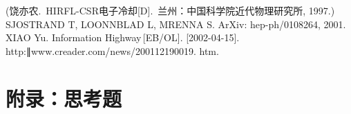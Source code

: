 \documentclass[a4paper,10.0pt,twoside]{npr}
\begin{document}
\begin{multicols}{2}
\begin{thebibliography}{90}
(饶亦农.\ HIRFL-CSR电子冷却[D].\ 兰州：中国科学院近代物理研究所, 1997.)
 SJOSTRAND T, LOONNBLAD L, MRENNA S. ArXiv: hep-ph/0108264, 2001.
 XIAO Yu. Information Highway\,[EB/OL]. [2002-04-15]. \\http:∥www.creader.com/news/200112190019. htm.

\end{thebibliography}

\end{multicols}

\newpage


\section*{附录：思考题}





\clearpage
\end{document}
